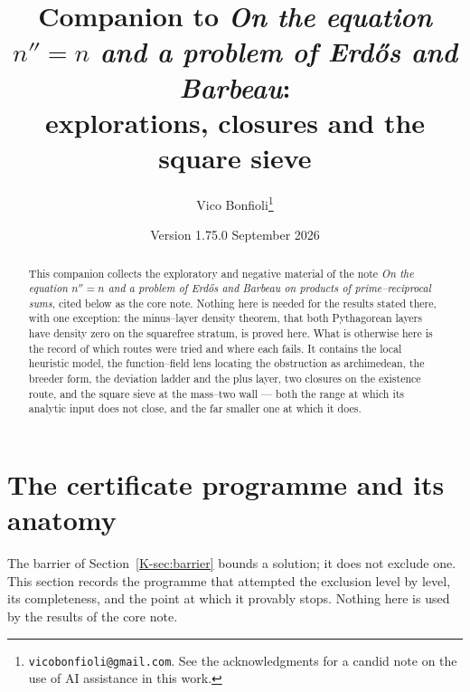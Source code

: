 \documentclass[11pt]{article}
\title{Companion to \emph{On the equation $n''=n$ and a problem of Erd\H{o}s and Barbeau}:\\ explorations, closures and the square sieve}
\author{Vico Bonfioli\thanks{\texttt{vicobonfioli@gmail.com}.
  See the acknowledgments for a candid note on the use of AI assistance in this work.}}
\date{Version 1.75.0\quad 2 September 2026}
\theoremstyle{definition}
\begin{document}
\maketitle

\begin{abstract}
This companion collects the exploratory and negative material of the note
\emph{On the equation $n''=n$ and a problem of Erd\H{o}s and Barbeau on products of
prime--reciprocal sums}, cited below as the core note. Nothing here is needed for the results
stated there, with one exception: the minus--layer density theorem, that both Pythagorean layers
have density zero on the squarefree stratum, is proved here. What is otherwise here is the record of
which routes were tried and where each fails. It contains the local heuristic model, the
function--field lens locating the obstruction as archimedean, the breeder form, the deviation ladder
and the plus layer, two closures on the existence route, and the square sieve at the mass--two wall
--- both the range at which its analytic input does not close, and the far smaller one at which it
does.
\end{abstract}
\section{The certificate programme and its anatomy}\label{sec:certificate}

The barrier of Section~\ref{K-sec:barrier} bounds a solution; it does not exclude one. This section
records the programme that attempted the exclusion level by level, its completeness, and the point
at which it provably stops. Nothing here is used by the results of the core note.
\end{document}

